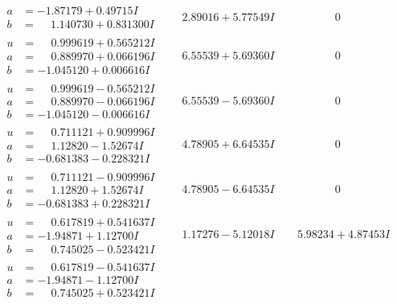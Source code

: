 \documentclass[1p]{elsarticle_modified}
\theoremstyle{definition}
\begin{document}
$$\begin{array}{c|c|c}
\begin{aligned}
a &= -1.87179 + 0.49715 I \\
b &= \phantom{-}1.140730 + 0.831300 I\end{aligned}
 & \phantom{-}2.89016 + 5.77549 I & \phantom{-0.000000 } 0 \\ \hline\begin{aligned}
u &= \phantom{-}0.999619 + 0.565212 I \\
a &= \phantom{-}0.889970 + 0.066196 I \\
b &= -1.045120 + 0.006616 I\end{aligned}
 & \phantom{-}6.55539 + 5.69360 I & \phantom{-0.000000 } 0 \\ \hline\begin{aligned}
u &= \phantom{-}0.999619 - 0.565212 I \\
a &= \phantom{-}0.889970 - 0.066196 I \\
b &= -1.045120 - 0.006616 I\end{aligned}
 & \phantom{-}6.55539 - 5.69360 I & \phantom{-0.000000 } 0 \\ \hline\begin{aligned}
u &= \phantom{-}0.711121 + 0.909996 I \\
a &= \phantom{-}1.12820 - 1.52674 I \\
b &= -0.681383 - 0.228321 I\end{aligned}
 & \phantom{-}4.78905 + 6.64535 I & \phantom{-0.000000 } 0 \\ \hline\begin{aligned}
u &= \phantom{-}0.711121 - 0.909996 I \\
a &= \phantom{-}1.12820 + 1.52674 I \\
b &= -0.681383 + 0.228321 I\end{aligned}
 & \phantom{-}4.78905 - 6.64535 I & \phantom{-0.000000 } 0 \\ \hline\begin{aligned}
u &= \phantom{-}0.617819 + 0.541637 I \\
a &= -1.94871 + 1.12700 I \\
b &= \phantom{-}0.745025 - 0.523421 I\end{aligned}
 & \phantom{-}1.17276 - 5.12018 I & \phantom{-}5.98234 + 4.87453 I \\ \hline\begin{aligned}
u &= \phantom{-}0.617819 - 0.541637 I \\
a &= -1.94871 - 1.12700 I \\
b &= \phantom{-}0.745025 + 0.523421 I\end{aligned}

\end{array}$$
\end{document}
